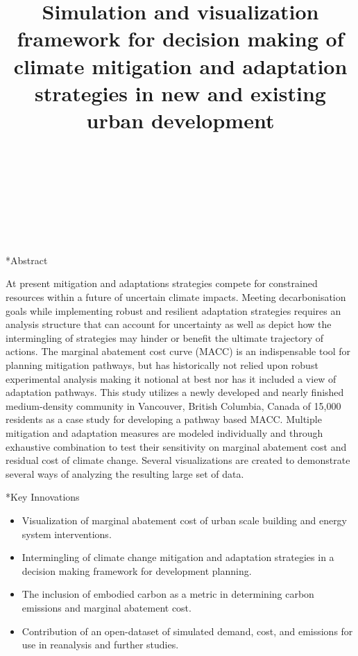 \documentclass[twocolumn, a4paper,10pt]{article}
\title{%
Simulation and visualization framework for decision making of climate mitigation  																								%
\vspace{4pt}
and adaptation strategies in new and existing urban development} 																																%
\author{																																														%
\\ 																				%
\\ 																																                                                            	%
\\ 																																                                                                %
\\ 			 			  	                                                    %
\\ 														                    	%
\phantom{Line 9}} 																																								            	%
\date{\vspace{-0.5cm}}	%
\makeatletter
\renewcommand\section{\@startsection{section}{1}{\z@}{3pt}{3pt}{\normalfont\large\bfseries}}
\makeatother
\begin{document}
\maketitle

\section*{Abstract}	%
\addtocounter{section}{1}
At present mitigation and adaptations strategies compete for constrained resources within a future of uncertain climate impacts. Meeting decarbonisation goals while implementing robust and resilient adaptation strategies requires an analysis structure that can account for uncertainty as well as depict how the intermingling of strategies may hinder or benefit the ultimate trajectory of actions. The marginal abatement cost curve (MACC) is an indispensable tool for planning mitigation pathways, but has historically not relied upon robust experimental analysis making it notional at best nor has it included a view of adaptation pathways. This study utilizes a newly developed and nearly finished medium-density community in Vancouver, British Columbia, Canada of 15,000 residents as a case study for developing a pathway based MACC. Multiple mitigation and adaptation measures are modeled individually and through exhaustive combination to test their sensitivity on marginal abatement cost and residual cost of climate change. Several visualizations are created to demonstrate several ways of analyzing the resulting large set of data.   

\section*{Key Innovations}
\begin{itemize}
\item Visualization of marginal abatement cost of urban scale building and energy system interventions.
\item Intermingling of climate change mitigation and adaptation strategies in a decision making framework for development planning.
\item The inclusion of embodied carbon as a metric in determining carbon emissions and marginal abatement cost.
\item Contribution of an open-dataset of simulated demand, cost, and emissions for use in reanalysis and further studies.
\end{itemize}
\end{document}
